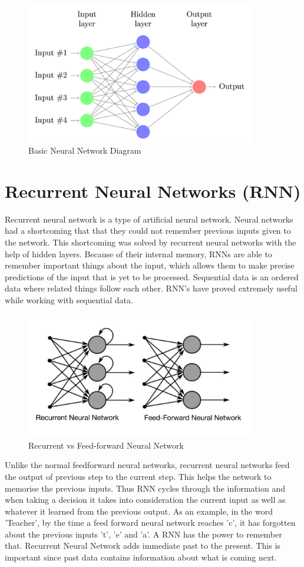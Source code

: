 \begin{figure}
	\caption{Basic Neural Network Diagram}
	\centering\includegraphics[width=10cm]{1.png}
\end{figure}

\section{Recurrent Neural Networks (RNN)}

Recurrent neural network is a type of artificial neural network. Neural networks had a shortcoming that that they could not remember previous inputs given to the network. This shortcoming was solved by recurrent neural
networks with the help of hidden layers. Because of their internal memory, RNNs
are able to remember important things about the input, which allows them to make
precise predictions of the input that is yet to be processed. Sequential data is an ordered data where
related things follow each other. RNN's have proved extremely useful while working with sequential data. 

\begin{figure}
	\caption{Recurrent vs Feed-forward Neural Network}
	\centering\includegraphics[width=10cm]{2.png}
\end{figure}

Unlike the normal feedforward neural networks, recurrent neural networks feed
the output of previous step to the current step. This helps the network to
memorise the previous inputs. Thus RNN cycles through the information and 
when taking a decision it takes into consideration the current input as
well as whatever it learned from the previous output. As an example, in the
word 'Teacher', by the time a feed forward neural network reaches 'c', it 
has forgotten about the previous inputs 't', 'e' and 'a'. A RNN has the power to remember that. Recurrent Neural
Network adds immediate past to the present. This is important since past data
contains information about what is coming next. 

